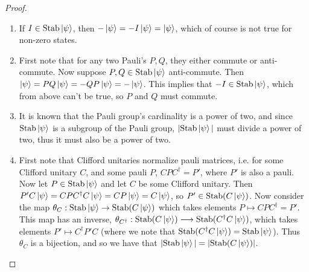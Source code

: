 \documentclass[12pt]{dalthesis}
\begin{document}
\begin{proof}
\hspace{20mm}
\begin{enumerate}
\item If $\-I \in \text{Stab}\ket{\psi}$, then $-\ket{\psi} =-I\ket{\psi} = \ket{\psi}$, which of course is not true for non-zero states.

\item First note that for any two Pauli's $P, Q$, they either commute or anti-commute. Now suppose $P, Q \in \text{Stab}\ket{\psi}$ anti-commute. Then $\ket{\psi} = PQ\ket{\psi} = -QP\ket{\psi} = -\ket{\psi}$. This implies that $-I \in \text{Stab}\ket{\psi}$, which from above can't be true, so $P$ and $Q$ must commute.

\item It is known that the Pauli group's cardinality is a power of two, and since $\text{Stab}\ket{\psi}$ is a subgroup of the Pauli group, $|\text{Stab}\ket{\psi}|$ must divide a power of two, thus it must also be a power of two.

\item First note that Clifford unitaries normalize pauli matrices, i.e. for some Clifford unitary $C$, and some pauli $P$, $CPC^{\dag} = P'$, where $P'$ is also a pauli. Now let $P \in \text{Stab}\ket{\psi}$ and let $C$ be some Clifford unitary. Then $P'C\ket{\psi} = CPC^{\dag}C\ket{\psi} = CP\ket{\psi} = C\ket{\psi}$, so $P' \in \text{Stab}(C\ket{\psi})$. Now consider the map $\theta_C : \text{Stab}\ket{\psi} \rightarrow \text{Stab}(C\ket{\psi})$ which takes elements $P \mapsto CPC^{\dag} = P'$. This map has an inverse, $\theta_{C^\dag}: \text{Stab}(C\ket{\psi}) \longrightarrow \text{Stab}(C^{\dag}C\ket{\psi})$, which takes elements $P' \mapsto C^{\dag}P'C$ (where we note that $\text{Stab}(C^{\dag}C\ket{\psi}) = \text{Stab}\ket{\psi}$). Thus $\theta_C$ is a bijection, and so we have that $|\text{Stab}\ket{\psi}| = |\text{Stab}(C\ket{\psi})|$.


\end{enumerate}
\end{proof}
\end{document}
